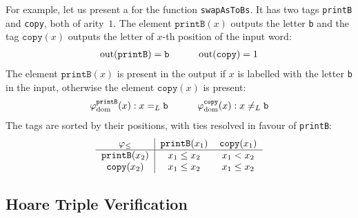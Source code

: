 For example, let us present a  for the function \texttt{swapAsToBs}. 
It has two tags \texttt{printB} and \texttt{copy}, both of arity~$1$. 
The element $\mathtt{printB}(x)$ outputs the letter \texttt{b} and the tag $\mathtt{copy}(x)$
outputs the letter of $x$-th position of the input word:
\[
\begin{tabular}{ccc}
    $\text{out}(\mathtt{printB}) = \mathtt{b}$ & \ \ \ & $\text{out}(\mathtt{copy}) = 1$ \\
\end{tabular}
\]
The element $\mathtt{printB}(x)$ is present in the output if $x$ is labelled with the letter \texttt{b}
in the input, otherwise the element $\mathtt{copy}(x)$ is present:
\[
\begin{tabular}{ccc}
    $\varphi_{\text{dom}}^{\mathtt{printB}}(x) : x =_L \mathtt{b}$ & \ \ \  &$\varphi_{\text{dom}}^{\mathtt{copy}}(x) : x \neq_L \mathtt{b}$ \\
\end{tabular}
\]
The tags are sorted by their positions, with ties resolved in favour of \texttt{printB}:
\[ 
\begin{tabular}{c|cc}
    $\varphi_{\leq}$ & $\mathtt{printB}(x_1)$ & $\mathtt{copy}(x_1)$ \\
    \hline
    $\mathtt{printB}(x_2)$ & $x_1 \leq x_2$ & $x_1 < x_2$ \\
    $\mathtt{copy}(x_2)$ & $x_1 \leq x_2$ & $x_1 \leq x_2$ \\
\end{tabular}
\]

\subsection{Hoare Triple Verification}
\label{sec:pullback}

